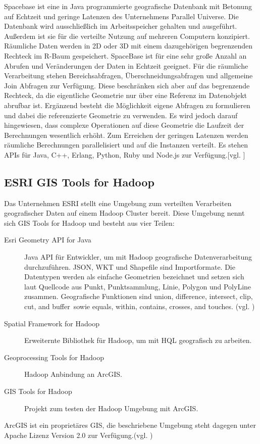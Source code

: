 Spacebase ist eine in Java programmierte geografische Datenbank mit Betonung auf Echtzeit und geringe Latenzen des Unternehmens Parallel Universe.
Die Datenbank wird ausschließlich im Arbeitsspeicher gehalten und ausgeführt.
Außerdem ist sie für die verteilte Nutzung auf mehreren Computern konzipiert.
Räumliche Daten werden in 2D oder 3D mit einem dazugehörigen begrenzenden Rechteck im R-Baum gespeichert.
SpaceBase ist für eine sehr große Anzahl an Abrufen und Veränderungen der Daten in Echtzeit geeignet.
Für die räumliche Verarbeitung stehen Bereichsabfragen, Überschneidungsabfragen und allgemeine Join Abfragen zur Verfügung.
Diese beschränken sich aber auf das begrenzende Rechteck, da die eigentliche Geometrie nur über eine Referenz im Datenobjekt abrufbar ist.
Ergänzend besteht die Möglichkeit eigene Abfragen zu formulieren und dabei die referenzierte Geometrie zu verwenden.
Es wird jedoch darauf hingewiesen, dass complexe Operationen auf diese Geometrie die Laufzeit der Berechnungen wesentlich erhöht.
Zum Erreichen der geringen Latenzen werden räumliche Berechnungen parallelisiert und auf die Instanzen verteilt.
Es stehen APIs für Java, C++, Erlang, Python, Ruby und Node.js zur Verfügung.[vgl. \cite{website:spacebase}]


\subsection{ESRI GIS Tools for Hadoop}
Das Unternehmen ESRI stellt eine Umgebung zum verteilten Verarbeiten geografischer Daten auf einem Hadoop Cluster bereit.
Diese Umgebung nennt sich GIS Tools for Hadoop und besteht aus vier Teilen:
\begin{description}
\item[Esri Geometry API for Java] Java API für Entwickler, um mit Hadoop geografische Datenverarbeitung durchzuführen. JSON, WKT und Shapefile sind Importformate. Die Datentypen werden als einfache Geometrien bezeichnet und setzen sich laut Quellcode aus Punkt, Punktsammlung, Linie, Polygon und PolyLine zusammen. Geografische Funktionen sind \glqq union, difference, intersect, clip, cut, and buffer\grqq \ sowie \glqq equals, within, contains, crosses, and touches\grqq . (vgl. \cite{website:esrigishadoopapi})
\item[Spatial Framework for Hadoop] Erweiternte Bibliothek für Hadoop, um mit HQL geografisch zu arbeiten.
\item[Geoprocessing Tools for Hadoop] Hadoop Anbindung an ArcGIS.
\item[GIS Tools for Hadoop] Projekt zum testen der Hadoop Umgebung mit ArcGIS.
\end{description}
ArcGIS ist ein proprietäres GIS, die beschriebene Umgebung steht dagegen unter Apache Lizenz Version 2.0 zur Verfügung.(vgl. \cite{website:esri-hadoop2})

